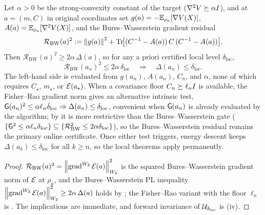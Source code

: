 \begin{proposition}
\label{prop:entry-residual}
Let $\alpha>0$ be the strong-convexity constant of the target ($\nabla^2V\succeq\alpha I$),
and at $a=(m,C)$ in original coordinates set $g(a)=-\mathbb{E}_{\rho_a}[\nabla V(X)]$,
$A(a)=\mathbb{E}_{\rho_a}[\nabla^2V(X)]$, and the Bures--Wasserstein gradient residual
\[
    \mathcal R_{\mathrm{BW}}(a)^2:=\left\lVert g(a)\right\rVert^2+\operatorname{Tr}\!\bigl[(C^{-1}-A(a))\,C\,(C^{-1}-A(a))\bigr].
\]
Then $\mathcal R_{\mathrm{BW}}(a)^2\geq2\alpha\,\Delta(a)$, so for any a priori certified local
level $\delta_{\mathrm{loc}}$,
\[
    \mathcal R_{\mathrm{BW}}(a_n)^2\leq2\alpha\,\delta_{\mathrm{loc}}
    \quad\Longrightarrow\quad
    \Delta(a_n)\leq\delta_{\mathrm{loc}} .
\]
The left-hand side is evaluated from $g(a_n)$, $A(a_n)$, $C_n$, and $\alpha$, none of which
requires $C_\star$, $m_\star$, or $\mathcal{E}(a_\star)$. When a covariance floor $C_n\succeq\ell_nI$
is available, the Fisher--Rao gradient norm gives an alternative intrinsic test,
$\mathsf{G}(a_n)^2\leq\alpha\ell_n\delta_{\mathrm{loc}}\Rightarrow\Delta(a_n)\leq\delta_{\mathrm{loc}}$,
convenient when $\mathsf{G}(a_n)$ is already evaluated by the algorithm; by
 it is more restrictive than the Bures--Wasserstein gate
($\{\mathsf{G}^2\leq\alpha\ell_n\delta_{\mathrm{loc}}\}\subseteq\{\mathcal R_{\mathrm{BW}}^2\leq2\alpha\delta_{\mathrm{loc}}\}$),
so the Bures--Wasserstein residual remains the primary online certificate. Once either test
triggers, energy descent keeps $\Delta(a_k)\leq\delta_{\mathrm{loc}}$ for all $k\geq n$, so the
local theorems apply permanently.
\end{proposition}

\begin{proof}
$\mathcal R_{\mathrm{BW}}(a)^2=\left\lVert \operatorname{grad}^{W_2}\mathcal{E}(a)\right\rVert_{W_2}^2$ is the squared
Bures--Wasserstein gradient norm of $\mathcal{E}$ at $\rho_a$, and the Bures--Wasserstein PL
inequality $\left\lVert \operatorname{grad}^{W_2}\mathcal{E}(a)\right\rVert_{W_2}^2\geq2\alpha\,\Delta(a)$ holds by
; the Fisher--Rao variant with the floor $\ell_n$ is . The
implications are immediate, and forward invariance of $\mathcal{U}_{\delta_{\mathrm{loc}}}$ is
(iv).
\end{proof}

